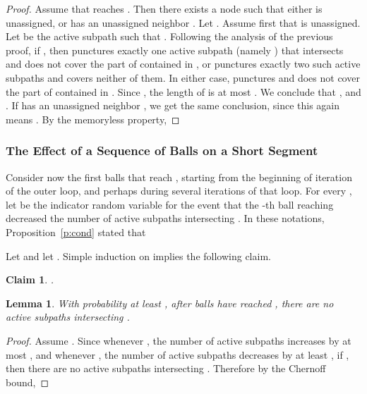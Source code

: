 \documentclass[twoside,leqno,twocolumn]{article}
\newtheorem{claim}[lemma]{Claim}
\newtheorem{lemma}[theorem]{Lemma}
\newtheorem{claim}[theorem]{Claim}
\begin{document}
\begin{proof}
Assume that  reaches . Then there exists a node  such that either  is unassigned, or  has an unassigned neighbor .
Let .
Assume first that  is unassigned. Let  be the active subpath such that .
Following the analysis of the previous proof, if , then  punctures exactly one active subpath (namely ) that intersects  and does not cover the part of  contained in , or  punctures exactly two  such active subpaths and covers neither of them. In either case,  punctures  and does not cover the part of  contained in . Since , the length of  is at most . We conclude that , and .
If  has an unassigned neighbor , we get the same conclusion, since this again means . By the memoryless property,
\ifprocs

\else

\fi
\end{proof}

\subsubsection{The Effect of a Sequence of Balls on a Short Segment}
Consider now the first  balls that reach , starting from the beginning of iteration  of the outer loop, and perhaps during several iterations of that loop. For every , let  be the indicator random variable for the event that the -th ball reaching  decreased the number of active subpaths intersecting . In these notations, Proposition~\ref{p:cond} stated that

Let  and let . Simple induction on  implies the following claim.
\begin{claim}
.
\end{claim}
\begin{lemma} \label{l:puncBalls}
With probability at least , after  balls have reached , there are no active subpaths intersecting .
\end{lemma} 
\begin{proof}
Assume .
Since whenever , the number of active subpaths increases by at most , and whenever , the number of active subpaths decreases by at least , if , then there are no active subpaths intersecting . Therefore by the Chernoff bound,

\end{proof}
\end{document}
